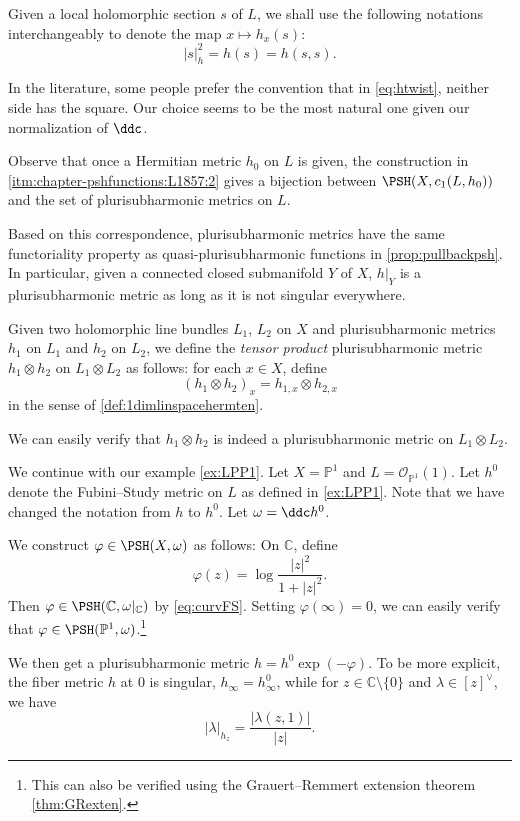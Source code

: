 Given a local holomorphic section $s$ of $L$, we shall use the following notations interchangeably to denote the map $x\mapsto h_x(s)$:
\[
|s|^2_h=h(s)=h(s,s).
\]

\begin{remark}\label{rmk:pshfunctions:L1864}
    In the literature, some people prefer the convention that in \eqref{eq:htwist}, neither side has the square. Our choice seems to be the most natural one given our normalization of $\ddc$.
\end{remark}

Observe that once a Hermitian metric $h_0$ on $L$ is given, the construction in \ref{itm:chapter-pshfunctions:L1857:2} gives a bijection between $\PSH(X,c_1(L,h_0))$ and the set of plurisubharmonic metrics on $L$.

Based on this correspondence, plurisubharmonic metrics have the same functoriality property as quasi-plurisubharmonic functions in \cref{prop:pullbackpsh}. In particular, given a connected closed submanifold $Y$ of $X$, $h|_Y$ is a plurisubharmonic metric as long as it is not singular everywhere.

\begin{definition}\label{def:tensorprodpshmetric}
    Given two holomorphic line bundles $L_1$, $L_2$ on $X$ and plurisubharmonic metrics $h_1$ on $L_1$ and $h_2$ on $L_2$, we define the \emph{tensor product} plurisubharmonic metric $h_1\otimes h_2$ on $L_1\otimes L_2$ as follows: for each $x\in X$, define
    \[
        (h_1\otimes h_2)_x=h_{1,x}\otimes h_{2,x}
    \]
    in the sense of \cref{def:1dimlinspacehermten}.
\end{definition}
We can easily verify that $h_1\otimes h_2$ is indeed a plurisubharmonic metric on $L_1\otimes L_2$.

\begin{example}\label{ex:logsingP1}
    We continue with our example \cref{ex:LPP1}. Let $X=\mathbb{P}^1$ and $L=\mathcal{O}_{\mathbb{P}^1}(1)$. Let $h^0$ denote the Fubini--Study metric on $L$ as defined in \cref{ex:LPP1}. Note that we have changed the notation from $h$ to $h^0$. Let $\omega=\ddc h^0$.

    We construct $\varphi\in \PSH(X,\omega)$ as follows: On $\mathbb{C}$, define
    \begin{equation}\label{eq:logsingP1ex}
    \varphi(z)=\log \frac{|z|^2}{1+|z|^2}.
    \end{equation}
    Then $\varphi\in \PSH(\mathbb{C},\omega|_{\mathbb{C}})$ by \eqref{eq:curvFS}. Setting $\varphi(\infty)=0$, we can easily verify that $\varphi\in \PSH(\mathbb{P}^1,\omega)$.\footnote{This can also be verified using the Grauert--Remmert extension theorem \cref{thm:GRexten}.}

    We then get a plurisubharmonic metric $h=h^0\exp(-\varphi)$. To be more explicit, the fiber metric $h$ at $0$ is singular, $h_{\infty}=h^0_{\infty}$, while for $z\in \mathbb{C}\setminus \{0\}$ and $\lambda\in [z]^{\vee}$, we have
    \[
    |\lambda|_{h_z}=\frac{|\lambda(z,1)|}{|z|}.
    \]
\end{example}


